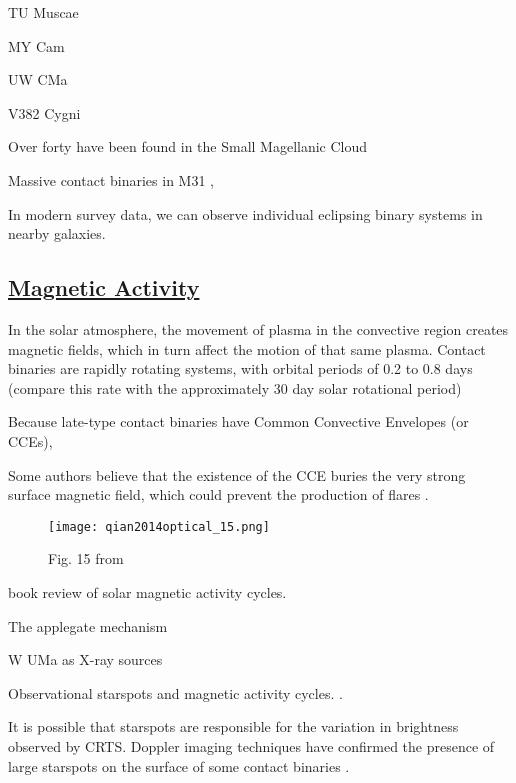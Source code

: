 \documentclass[12pt]{article} %
\numberwithin{equation}{section} %
\begin{document}
TU Muscae \citep{penny2008tomographic}

MY Cam \citep{lorenzo2014my}

UW CMa \citep{antokhina2011light}

V382 Cygni \citep{popper1978masses}

Over forty have been found in the Small Magellanic Cloud \citep{hilditch2005forty}

Massive contact binaries in M31 \citep{lee2014properties}, \citep{vilardell2006eclipsing}

In modern survey data, we can observe individual eclipsing binary systems in nearby galaxies.



\subsection[Magnetic Activity]{\hyperlink{toc}{Magnetic Activity}}

In the solar atmosphere, the movement of plasma in the convective region creates magnetic fields, which in turn affect the motion of that same plasma. Contact binaries are rapidly rotating systems, with orbital periods of 0.2 to 0.8 days (compare this rate with the approximately 30 day solar rotational period)

 Because late-type contact binaries have Common Convective Envelopes (or CCEs), 

Some authors believe that the existence of the CCE buries the very strong surface magnetic field, which could prevent the production of flares \citep{qian2014optical}. 

\begin{figure}[H]
\centering
\texttt{[image: qian2014optical\_15.png]}
\caption{Fig. 15 from \citet{qian2014optical}}
\label{fig: qian2014optical_15}
\end{figure}

\citep{balogh2015solar} book review of solar magnetic activity cycles.

The applegate mechanism \citep{applegate1992mechanism} \citep{lanza2006internal}

W UMa as X-ray sources \citep{stepien2001rosat}

Observational starspots and magnetic activity cycles.  \citep{borkovits2005indirect,qian2000possible,kaszas1998period,qian2007ad,lee2004period,yang2012deep,zhang2004long}.

It is possible that starspots are responsible for the variation in brightness observed by CRTS. Doppler imaging techniques have confirmed the presence of large starspots on the surface of some contact binaries \citep{barnes2004high}. 
\end{document}

